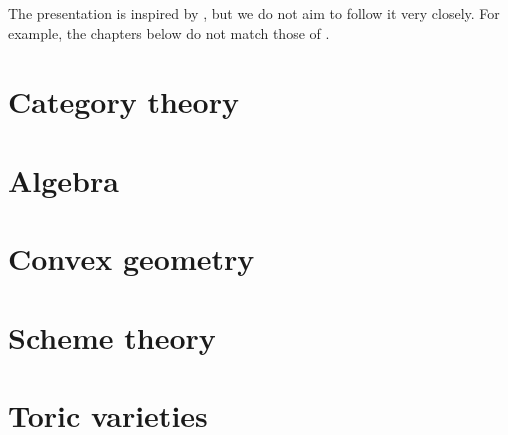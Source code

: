 %

The presentation is inspired by \cite{Cox_2011},
but we do not aim to follow it very closely.
For example, the chapters below do not match those of \cite{Cox_2011}.

\chapter{Category theory}




\chapter{Algebra}





\chapter{Convex geometry}



\chapter{Scheme theory}





\chapter{Toric varieties}






